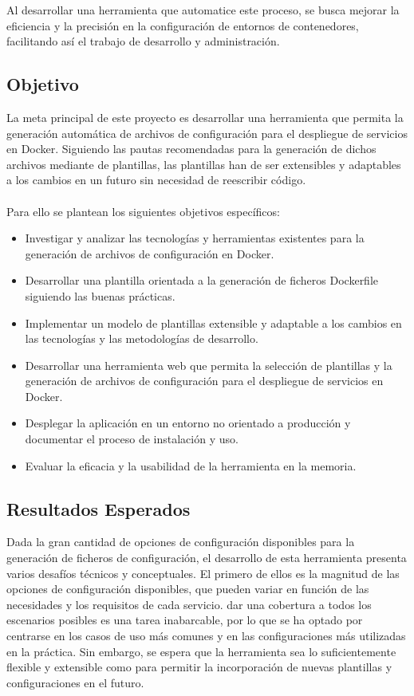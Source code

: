 \documentclass[12pt, a4paper, twoside]{article}
\begin{document}
Al desarrollar una herramienta que automatice este proceso, se busca mejorar la eficiencia y la precisión en la configuración de entornos de contenedores, facilitando así el trabajo de desarrollo y administración. 

\subsection{Objetivo}
La meta principal de este proyecto es desarrollar una herramienta que permita la generación automática de archivos de configuración para el despliegue de servicios en Docker.
Siguiendo las pautas recomendadas para la generación de dichos archivos mediante de plantillas, las plantillas han de ser extensibles y adaptables a los cambios en un futuro sin necesidad de reescribir código.
\\ \\
Para ello se plantean los siguientes objetivos específicos:
\begin{itemize}
	\item Investigar y analizar las tecnologías y herramientas existentes para la generación de archivos de configuración en Docker.
	\item Desarrollar una plantilla orientada a la generación de ficheros Dockerfile siguiendo las buenas prácticas.
	\item Implementar un modelo de plantillas extensible y adaptable a los cambios en las tecnologías y las metodologías de desarrollo.
	\item Desarrollar una herramienta web que permita la selección de plantillas y la generación de archivos de configuración para el despliegue de servicios en Docker.
	\item Desplegar la aplicación en un entorno no orientado a producción y documentar el proceso de instalación y uso.
	\item Evaluar la eficacia y la usabilidad de la herramienta en la memoria.
\end{itemize}

\newpage 
\subsection{Resultados Esperados}
Dada la gran cantidad de opciones de configuración disponibles para la generación de ficheros de configuración, el desarrollo de esta herramienta presenta varios desafíos técnicos y conceptuales.
El primero de ellos es la magnitud de las opciones de configuración disponibles, que pueden variar en función de las necesidades y los requisitos de cada servicio.
dar una cobertura a todos los escenarios posibles es una tarea inabarcable, por lo que se ha optado por centrarse en los casos de uso más comunes y en las configuraciones más utilizadas en la práctica.
Sin embargo, se espera que la herramienta sea lo suficientemente flexible y extensible como para permitir la incorporación de nuevas plantillas y configuraciones en el futuro.
\end{document}
